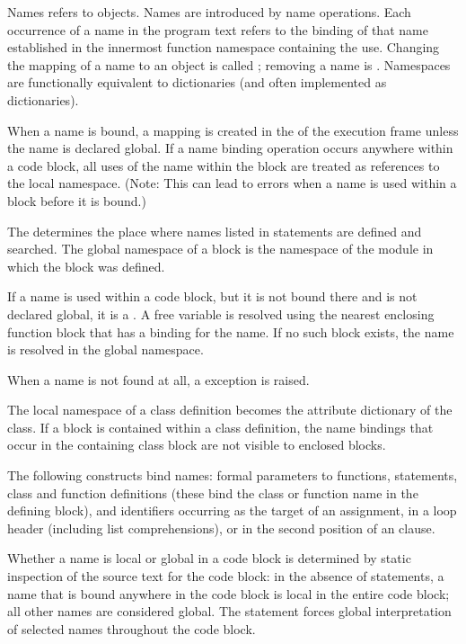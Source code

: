 Names refers to objects.  Names are introduced by name
 operations.  Each occurrence of a name
in the program text refers to the binding of that name established in
the innermost function namespace containing the use.  Changing the
mapping of a name to an object is called
; removing a name is 
.  Namespaces are functionally
equivalent to dictionaries (and often implemented as dictionaries).

When a name is bound, a mapping is created in the  of the execution frame unless the
name is declared global.  If a name binding operation occurs anywhere
within a code block, all uses of the name within the block are treated
as references to the local namespace.  (Note: This can lead to errors
when a name is used within a block before it is bound.)

The  determines the
place where names listed in 
statements are defined and searched.  The global namespace of a block
is the namespace of the module in which the block was defined.

If a name is used within a code block, but it is not bound there and
is not declared global, it is a 
.  A free variable is resolved using the
nearest enclosing function block that has a binding for the name.  If
no such block exists, the name is resolved in the global namespace.

When a name is not found at all, a
 exception is raised.

The local namespace of a class definition becomes the attribute
dictionary of the class. If a block is contained within a class
definition, the name bindings that occur in the containing class block
are not visible to enclosed blocks.

The following constructs bind names: formal parameters to functions,
 statements, class and function definitions (these bind
the class or function name in the defining block), and identifiers
occurring as the target of an assignment, in a  loop header
(including list comprehensions), or in the second position of an
 clause.

Whether a name is local or global in a code block is determined by
static inspection of the source text for the code block: in the
absence of  statements, a name that is bound anywhere
in the code block is local in the entire code block; all other names
are considered global.  The  statement forces global
interpretation of selected names throughout the code block.  

